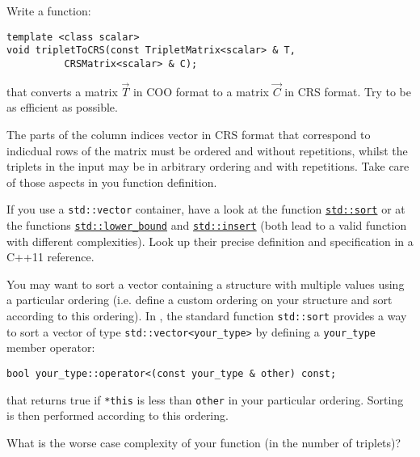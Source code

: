 \begin{problem}
 \begin{subproblem}[5]
  Write a function:
  \begin{verbatim}
template <class scalar>
void tripletToCRS(const TripletMatrix<scalar> & T,
		  CRSMatrix<scalar> & C);
  \end{verbatim}
  that converts a matrix $\vec{T}$ in COO format to a matrix $\vec{C}$ in CRS
  format. Try to be as efficient as possible.
  
  \begin{hint}
    The parts of the column indices vector in CRS format that correspond to
    indicdual rows of the matrix must be ordered and without repetitions, whilst
    the triplets in the input may be in arbitrary ordering and with
    repetitions. Take care of those aspects in you function definition.
  \end{hint}
  
  \begin{hint}
   If you use a \verb|std::vector| container, have a look at the function
   \href{http://www.cplusplus.com/reference/algorithm/sort/}{\texttt{std::sort}}
   or at the functions
   \href{http://www.cplusplus.com/reference/algorithm/lower_bound/}{\texttt{std::lower\_bound}}
   and
   \href{http://www.cplusplus.com/reference/vector/vector/insert/}{\texttt{std::insert}}
   (both lead to a valid function with different complexities). Look up their
   precise definition and specification in a C++11 reference. 
  \end{hint}
  
  \begin{hint}
   You may want to sort a vector containing a structure with multiple values using a particular ordering (i.e. define a custom ordering on your structure and sort according to this ordering). In \Cpp{}, the standard function \verb|std::sort| provides a way to sort a vector of type \verb|std::vector<your_type>| by defining a \verb|your_type| member operator:
  \begin{verbatim}
bool your_type::operator<(const your_type & other) const;
  \end{verbatim}
  that returns true if \verb|*this| is less than \verb|other| in your particular ordering. Sorting is then performed according to this ordering.
  \end{hint}

 \end{subproblem}

 \begin{subproblem}[3]
  What is the worse case complexity of your function (in the number of triplets)?
  

\end{subproblem}
\end{problem}
